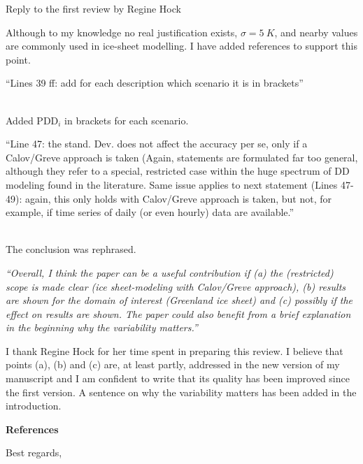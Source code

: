 \documentclass{letter}
\newcommand{\rev}[0]{\color{blue!50!black}\it}
\newcommand{\textrev}[1]{{\rev``#1''}}
\newcommand{\revpoint}[1]{{\rev\item``#1''}\\}
\begin{document}
\begin{letter}{Reply to the first review by Regine Hock}
\begin{enumerate}[resume]
    Although to my knowledge no real justification exists, $\sigma = 5~K$, and nearby values are commonly used in ice-sheet modelling. I have added references to support this point.

    \revpoint{Lines 39 ff: add for each description which scenario it is in brackets}

    Added $\textrm{PDD}_i$ in brackets for each scenario.

    \revpoint{Line 47: the stand. Dev. does not affect the accuracy per se, only if a Calov/Greve approach is taken (Again, statements are formulated far too general, although they refer to a special, restricted case within the huge spectrum of DD modeling found in the literature. Same issue applies to next statement (Lines 47- 49): again, this only holds with Calov/Greve approach is taken, but not, for example, if time series of daily (or even hourly) data are available.}

    The conclusion was rephrased.

\end{enumerate}


\textrev{Overall, I think the paper can be a useful contribution if (a) the (restricted) scope is made clear (ice sheet-modeling with Calov/Greve approach), (b) results are shown for the domain of interest (Greenland ice sheet) and (c) possibly if the effect on results are shown. The paper could also benefit from a brief explanation in the beginning why the variability matters.}

I thank Regine Hock for her time spent in preparing this review. I believe that points (a), (b) and (c) are, at least partly, addressed in the new version of my manuscript and I am confident to write that its quality has been improved since the first version. A sentence on why the variability matters has been added in the introduction.

\textbf{References}



\closing{Best regards,}

\end{letter}
\end{document}
